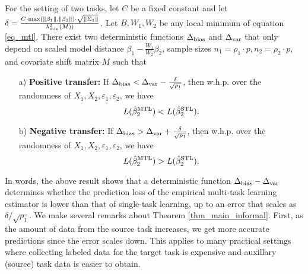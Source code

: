 
\begin{theorem}\label{thm_main_informal}
	For the setting of two tasks, let $C$ be a fixed constant and let $\delta = \frac{ C\cdot \max(\|\beta_1\|, \|\beta_2\|) \cdot \sqrt{\|\Sigma_1\|} } {\lambda_{\min}^2(M)) }$.
	Let $B, W_1, W_2$ be any local minimum of equation \eqref{eq_mtl}.
 	There exist two deterministic functions $\Delta_{\text{bias}}$ and $\Delta_{\text{var}}$ that only depend on scaled model distance $\beta_1 - \frac{W_1}{W_2} \beta_2$, sample sizes $n_1 = \rho_1 \cdot p, n_2 = \rho_2 \cdot p$, and covariate shift matrix $M$ such that
	\begin{enumerate}
		\item[a)] \textbf{Positive transfer:} If $\Delta_{\text{bias}} < \Delta_{\text{var}} -  \frac{\delta}{\sqrt{\rho_1}} $, then w.h.p. over the randomness of $X_1, X_2, \varepsilon_1, \varepsilon_2$, we have
			\[ L(\hat{\beta}_2^{\textup{MTL}}) < L(\hat{\beta}_2^{\textup{STL}}).  \]
		\item[b)] \textbf{Negative transfer:} If $\Delta_{\text{bias}} > \Delta_{\text{var}} + \frac{\delta}{\sqrt{\rho_1}}$, then w.h.p. over the randomness of $X_1, X_2, \varepsilon_1, \varepsilon_2$, we have
			\[ L(\hat{\beta}_2^{\textup{MTL}}) > L(\hat{\beta}_2^{\textup{STL}}). \]
	\end{enumerate}
\end{theorem}
In words, the above result shows that a deterministic function $\Delta_{\text{bias}} - \Delta_{\text{var}}$ determines whether the prediction loss of the empirical multi-task learning estimator is lower than that of single-task learning, up to an error that scales as $\delta / \sqrt{\rho_1}$.
We make several remarks about Theorem \ref{thm_main_informal}.
First, as the amount of data from the source task increases, we get more accurate predictions  since the error scales down.
This applies to many practical settings where collecting labeled data for the target task is expensive and auxillary (source) task data is easier to obtain.
